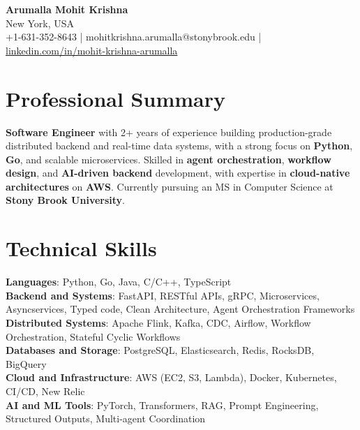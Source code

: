 \documentclass[letterpaper,11pt]{article}
\begin{document}
\begin{center}
  {\Large \textbf{Arumalla Mohit Krishna}} \\
  New York, USA \\
  +1-631-352-8643 \enspace | \enspace mohitkrishna.arumalla@stonybrook.edu \enspace | \enspace \href{https://www.linkedin.com/in/mohit-krishna-arumalla}{linkedin.com/in/mohit-krishna-arumalla}
\end{center}

\section{Professional Summary}
  \begin{itemize}[leftmargin=0.15in, label={}]
    \small{\item{
     \textbf{Software Engineer} with 2+ years of experience building production-grade distributed backend and real-time data systems, with a strong focus on \textbf{Python}, \textbf{Go}, and scalable microservices. Skilled in \textbf{agent orchestration}, \textbf{workflow design}, and \textbf{AI-driven backend} development, with expertise in \textbf{cloud-native architectures} on \textbf{AWS}. Currently pursuing an MS in Computer Science at \textbf{Stony Brook University}.
    }}
  \end{itemize}
\vspace{-16pt}

\section{Technical Skills}
 \begin{itemize}[leftmargin=0.15in, label={}]
    \small{\item{
     \textbf{Languages}: Python, Go, Java, C/C++, TypeScript \\
     \textbf{Backend and Systems}: FastAPI, RESTful APIs, gRPC, Microservices, Asyncservices, Typed code, Clean Architecture, Agent Orchestration Frameworks \\
     \textbf{Distributed Systems}: Apache Flink, Kafka, CDC, Airflow, Workflow Orchestration, Stateful Cyclic Workflows \\
     \textbf{Databases and Storage}: PostgreSQL, Elasticsearch, Redis, RocksDB, BigQuery \\
     \textbf{Cloud and Infrastructure}: AWS (EC2, S3, Lambda), Docker, Kubernetes, CI/CD, New Relic \\
     \textbf{AI and ML Tools}: PyTorch, Transformers, RAG, Prompt Engineering, Structured Outputs, Multi-agent Coordination
    }}
 \end{itemize}
\vspace{-16pt}
\end{document}
